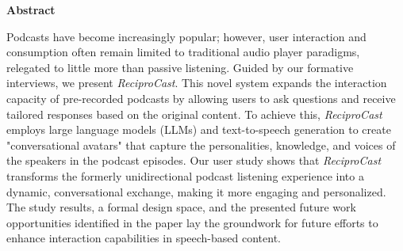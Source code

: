 \documentclass[12pt]{report}
\begin{document}
    \newenvironment{myfont}{\selectfont}{\par}
    \begin{myfont}
        \vspace*{\fill}
            \begin{center}
                \singlespacing
                \normalsize
                \begin{minipage}{0.8\textwidth}
                    \setlength{\parindent}{0pt}
                    \begin{center}
                        \Large\textbf{Abstract}
                    \end{center}
                    Podcasts have become increasingly popular; however, user interaction and consumption often remain limited to traditional audio player paradigms, relegated to little more than passive listening. Guided by our formative interviews, we present \textit{ReciproCast}. This novel system expands the interaction capacity of pre-recorded podcasts by allowing users to ask questions and receive tailored responses based on the original content. To achieve this, \textit{ReciproCast} employs large language models (LLMs) and text-to-speech generation to create "conversational avatars" that capture the personalities, knowledge, and voices of the speakers in the podcast episodes. Our user study shows that \textit{ReciproCast} transforms the formerly unidirectional podcast listening experience into a dynamic, conversational exchange, making it more engaging and personalized. The study results, a formal design space, and the presented future work opportunities identified in the paper lay the groundwork for future efforts to enhance interaction capabilities in speech-based content.
                \end{minipage}
            \end{center}
        \vspace*{\fill}
        \clearpage
        

\end{myfont}
\end{document}
